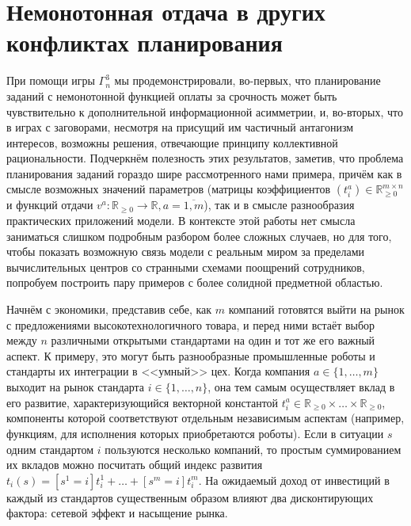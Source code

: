 \section{Немонотонная отдача в других конфликтах планирования}\label{sec:ch2/sec7}

При помощи игры $\Gamma^3_n$ мы продемонстрировали, во-первых, что планирование заданий с немонотонной функцией оплаты за срочность может быть чувствительно к дополнительной информационной асимметрии, и, во-вторых, что в играх с заговорами, несмотря на присущий им частичный антагонизм интересов, возможны решения, отвечающие принципу коллективной рациональности. Подчеркнём полезность этих результатов, заметив, что проблема планирования заданий гораздо шире рассмотренного нами примера, причём как в смысле возможных значений параметров (матрицы коэффициентов $(t_i^a) \in \mathbb{R}_{\ge 0}^{m \times n}$ и функций отдачи $v^a : \mathbb{R}_{\ge 0} \rightarrow \mathbb{R}, a = \overline{1,m}$), так и в смысле разнообразия практических приложений модели. В контексте этой работы нет смысла заниматься слишком подробным разбором более сложных случаев, но для того, чтобы показать возможную связь модели с реальным миром за пределами вычислительных центров со странными схемами поощрений сотрудников, попробуем построить пару примеров с более солидной предметной областью.

Начнём с экономики, представив себе, как $m$ компаний готовятся выйти на рынок с предложениями высокотехнологичного товара, и перед ними встаёт выбор между $n$ различными открытыми стандартами на один и тот же его важный аспект. К примеру, это могут быть разнообразные промышленные роботы и стандарты их интеграции в <<умный>> цех. Когда компания $a \in \{1, \ldots, m\}$ выходит на рынок стандарта $i \in \{1, \ldots, n\}$, она тем самым осуществляет вклад в его развитие, характеризующийся векторной константой $t_i^a \in \mathbb{R}_{\ge 0} \times \ldots \times \mathbb{R}_{\ge 0}$, компоненты которой соответствуют отдельным независимым аспектам (например, функциям, для исполнения которых приобретаются роботы). Если в ситуации $s$ одним стандартом $i$ пользуются несколько компаний, то простым суммированием их вкладов можно посчитать общий индекс развития $t_i(s) = [s^1 = i] t_i^1 + \ldots + [s^m = i] t_i^m$. На ожидаемый доход от инвестиций в каждый из стандартов существенным образом влияют два дисконтирующих фактора: сетевой эффект и насыщение рынка.

